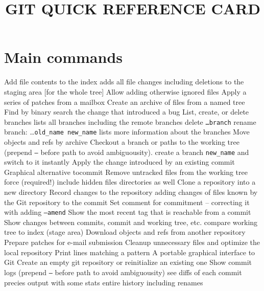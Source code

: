 
\title{GIT QUICK REFERENCE CARD}

\shortcopyrightnotice

\section{Main commands}
	{Add file contents to the index}
	{adds all file changes including deletions to the staging area [for the whole tree]}
	{Allow adding otherwise ignored files}
	{Apply a series of patches from a mailbox}
	{Create an archive of files from a named tree}
	{Find by binary search the change that introduced a bug}
	{List, create, or delete branches}
	{lists all branches including the remote branches}
	{delete {\tt \dots branch}}
	{rename branch: \dots {\tt old\_name new\_name}}
	{lists more information about the branches}
	{Move objects and refs by archive}
	{Checkout a branch or paths to the working tree (prepend {\tt --} before path to avoid ambiguousity).}
	{create a branch {\tt new\_name} and switch to it instantly}
	{Apply the change introduced by an existing commit}
	{Graphical alternative tocommit}
	{Remove untracked files from the working tree}
	{force (required!)}
	{include hidden files}
	{directories as well}
	{Clone a repository into a new directory}
	{Record changes to the repository}
	{adding changes of files known by the Git repository to the commit}
	{Set comment for commitment -- correcting it with adding {\tt --amend}}
	{Show the most recent tag that is reachable from a commit}
	{Show changes between commits, commit and working tree, etc.}
	{compare working tree to index (stage area)}
	{Download objects and refs from another repository}
	{Prepare patches for e-mail submission}
	{Cleanup unnecessary files and optimize the local repository}
	{Print lines matching a pattern}
	{A portable graphical interface to Git}
	{Create an empty git repository or reinitialize an existing one}
	{Show commit logs (prepend {\tt --} before path to avoid ambiguousity)}
	{see diffs of each commit}
	{precies output with some stats}
	{entire history including renames}
